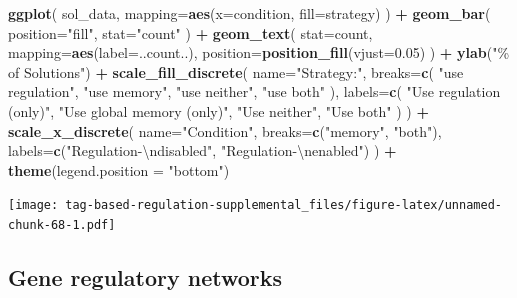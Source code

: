 \documentclass[
]{book}
\newenvironment{Shaded}{\begin{snugshade}}{\end{snugshade}}
\newcommand{\CharTok}[1]{\textcolor[rgb]{0.31,0.60,0.02}{#1}}
\newcommand{\DataTypeTok}[1]{\textcolor[rgb]{0.13,0.29,0.53}{#1}}
\newcommand{\FloatTok}[1]{\textcolor[rgb]{0.00,0.00,0.81}{#1}}
\newcommand{\KeywordTok}[1]{\textcolor[rgb]{0.13,0.29,0.53}{\textbf{#1}}}
\newcommand{\NormalTok}[1]{#1}
\newcommand{\OperatorTok}[1]{\textcolor[rgb]{0.81,0.36,0.00}{\textbf{#1}}}
\newcommand{\StringTok}[1]{\textcolor[rgb]{0.31,0.60,0.02}{#1}}
\begin{document}
\begin{Shaded}
\begin{Highlighting}[]
\KeywordTok{ggplot}\NormalTok{( sol\_data, }\DataTypeTok{mapping=}\KeywordTok{aes}\NormalTok{(}\DataTypeTok{x=}\NormalTok{condition, }\DataTypeTok{fill=}\NormalTok{strategy) ) }\OperatorTok{+}
\StringTok{  }\KeywordTok{geom\_bar}\NormalTok{(}
    \DataTypeTok{position=}\StringTok{"fill"}\NormalTok{,}
    \DataTypeTok{stat=}\StringTok{"count"}
\NormalTok{  ) }\OperatorTok{+}
\StringTok{  }\KeywordTok{geom\_text}\NormalTok{(}
    \DataTypeTok{stat=}\StringTok{\textquotesingle{}count\textquotesingle{}}\NormalTok{,}
    \DataTypeTok{mapping=}\KeywordTok{aes}\NormalTok{(}\DataTypeTok{label=}\NormalTok{..count..),}
    \DataTypeTok{position=}\KeywordTok{position\_fill}\NormalTok{(}\DataTypeTok{vjust=}\FloatTok{0.05}\NormalTok{)}
\NormalTok{  ) }\OperatorTok{+}
\StringTok{  }\KeywordTok{ylab}\NormalTok{(}\StringTok{"\% of Solutions"}\NormalTok{) }\OperatorTok{+}
\StringTok{  }\KeywordTok{scale\_fill\_discrete}\NormalTok{(}
    \DataTypeTok{name=}\StringTok{"Strategy:"}\NormalTok{,}
    \DataTypeTok{breaks=}\KeywordTok{c}\NormalTok{(}
      \StringTok{"use regulation"}\NormalTok{,}
      \StringTok{"use memory"}\NormalTok{,}
      \StringTok{"use neither"}\NormalTok{,}
      \StringTok{"use both"}
\NormalTok{    ),}
    \DataTypeTok{labels=}\KeywordTok{c}\NormalTok{(}
      \StringTok{"Use regulation (only)"}\NormalTok{,}
      \StringTok{"Use global memory (only)"}\NormalTok{,}
      \StringTok{"Use neither"}\NormalTok{,}
      \StringTok{"Use both"}
\NormalTok{    )}
\NormalTok{  ) }\OperatorTok{+}
\StringTok{  }\KeywordTok{scale\_x\_discrete}\NormalTok{(}
    \DataTypeTok{name=}\StringTok{"Condition"}\NormalTok{,}
    \DataTypeTok{breaks=}\KeywordTok{c}\NormalTok{(}\StringTok{"memory"}\NormalTok{, }\StringTok{"both"}\NormalTok{),}
    \DataTypeTok{labels=}\KeywordTok{c}\NormalTok{(}\StringTok{"Regulation{-}}\CharTok{\textbackslash{}n}\StringTok{disabled"}\NormalTok{, }\StringTok{"Regulation{-}}\CharTok{\textbackslash{}n}\StringTok{enabled"}\NormalTok{)}
\NormalTok{  ) }\OperatorTok{+}
\StringTok{  }\KeywordTok{theme}\NormalTok{(}\DataTypeTok{legend.position =} \StringTok{"bottom"}\NormalTok{)}
\end{Highlighting}
\end{Shaded}

\texttt{[image: tag-based-regulation-supplemental\_files/figure-latex/unnamed-chunk-68-1.pdf]}

\hypertarget{gene-regulatory-networks-1}{%
\subsection{Gene regulatory networks}\label{gene-regulatory-networks-1}}
\end{document}
